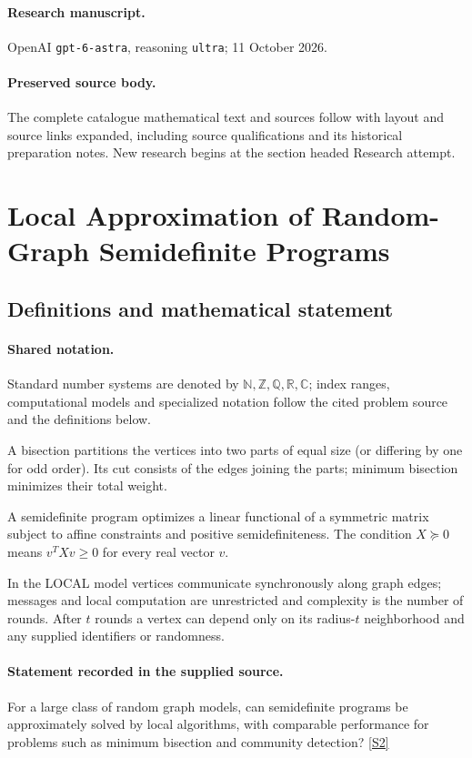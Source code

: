 \documentclass[11pt]{article}
\begin{document}
\paragraph{Research manuscript.} OpenAI \texttt{gpt-6-astra}, reasoning \texttt{ultra}; 11 October 2026.
\paragraph{Preserved source body.} The complete catalogue mathematical text and sources follow with layout and source links expanded, including source qualifications and its historical preparation notes. New research begins at the section headed Research attempt.

\section{Local Approximation of Random-Graph Semidefinite Programs}\label{statement}

\subsection{Definitions and mathematical statement}

\paragraph{Shared notation.}Standard number systems are denoted by $\mathbb N,\mathbb Z,\mathbb Q,\mathbb R,\mathbb C$; index ranges, computational models and specialized notation follow the cited problem source and the definitions below.


A bisection partitions the vertices into two parts of equal size (or differing by one for odd order). Its cut consists of the edges joining the parts; minimum bisection minimizes their total weight.

A semidefinite program optimizes a linear functional of a symmetric matrix subject to affine constraints and positive semidefiniteness. The condition $X\succeq0$ means $v^TXv\geq0$ for every real vector $v$.

In the LOCAL model vertices communicate synchronously along graph edges; messages and local computation are unrestricted and complexity is the number of rounds. After $t$ rounds a vertex can depend only on its radius-$t$ neighborhood and any supplied identifiers or randomness.
\paragraph{Statement recorded in the supplied source.}
For a large class of random graph models, can semidefinite programs be approximately solved by local algorithms, with comparable performance for problems such as minimum bisection and community detection? \href{https://doi.org/10.4171/owr/2018/29}{[S2]}
\end{document}
